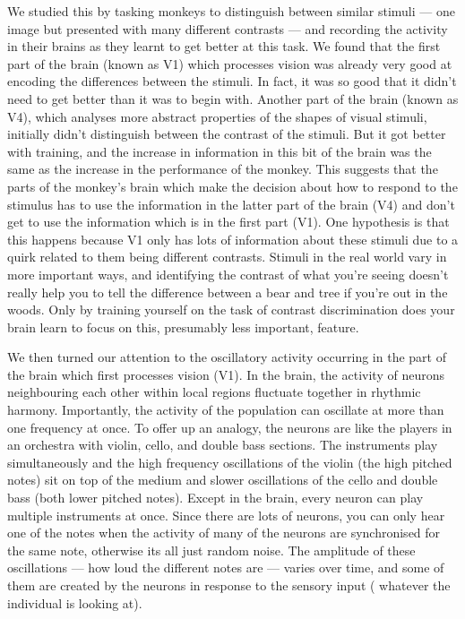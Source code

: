 We studied this by tasking monkeys to distinguish between similar stimuli --- one image but presented with many different contrasts --- and recording the activity in their brains as they learnt to get better at this task.
We found that the first part of the brain (known as \acs{V1}) which processes vision was already very good at encoding the differences between the stimuli.
In fact, it was so good that it didn't need to get better than it was to begin with.
Another part of the brain (known as \acs{V4}), which analyses more abstract properties of the shapes of visual stimuli, initially didn't distinguish between the contrast of the stimuli.
But it got better with training, and the increase in information in this bit of the brain was the same as the increase in the performance of the monkey.
This suggests that the parts of the monkey's brain which make the decision about how to respond to the stimulus has to use the information in the latter part of the brain (\acs{V4}) and don't get to use the information which is in the first part (\acs{V1}).
One hypothesis is that this happens because \acs{V1} only has lots of information about these stimuli due to a quirk related to them being different contrasts.
Stimuli in the real world vary in more important ways, and identifying the contrast of what you're seeing doesn't really help you to tell the difference between a bear and tree if you're out in the woods.
Only by training yourself on the task of contrast discrimination does your brain learn to focus on this, presumably less important, feature.


We then turned our attention to the oscillatory activity occurring in the part of the brain which first processes vision (\acs{V1}).
In the brain, the activity of neurons neighbouring each other within local regions fluctuate together in rhythmic harmony.
Importantly, the activity of the population can oscillate at more than one frequency at once.
To offer up an analogy, the neurons are like the players in an orchestra with violin, cello, and double bass sections.
The instruments play simultaneously and the high frequency oscillations of the violin (the high pitched notes) sit on top of the medium and slower oscillations of the cello and double bass (both lower pitched notes).
Except in the brain, every neuron can play multiple instruments at once.
Since there are lots of neurons, you can only hear one of the notes when the activity of many of the neurons are synchronised for the same note, otherwise its all just random noise.
The amplitude of these oscillations --- how loud the different notes are --- varies over time, and some of them are created by the neurons in response to the sensory input (\ie{} whatever the individual is looking at).

